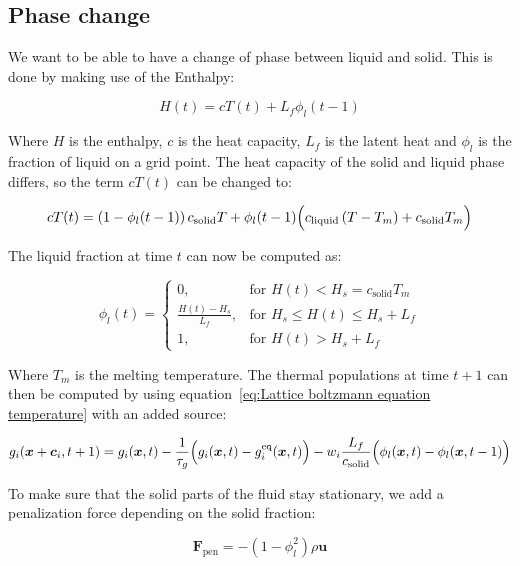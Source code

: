 \subsection{Phase change}
We want to be able to have a change of phase between liquid and solid. This is done by making use of the Enthalpy:

\begin{equation}\label{eq:Enthalpy}
    H(t) = c T(t) + L_f \phi_l(t-1)
\end{equation}

Where $H$ is the enthalpy, $c$ is the heat capacity, $L_f$ is the latent heat and $\phi_l$ is the fraction of liquid on a grid point. The heat capacity of the solid and liquid phase differs, so the term $c T(t)$ can be changed to:

\begin{equation}
    c T(t) = \left(1 - \phi_l(t-1)\right)c_{\text{solid}} T + \phi_l(t-1) \Bigl(c_{\text{liquid}} \left(T - T_m\right) + c_{\text{solid}}T_m\Bigr)
\end{equation}

The liquid fraction at time $t$ can now be computed as:

\begin{equation}
    \phi_l(t) = 
    \begin{cases}
        0, & \text{for } H(t) < H_s = c_{\text{solid}} T_m\\
        \frac{H(t)-H_s}{L_f}, & \text{for } H_s \leq H(t) \leq H_s + L_f\\
        1, & \text{for } H(t) > H_s + L_f
    \end{cases}
\end{equation}

Where $T_m$ is the melting temperature. The thermal populations at time $t+1$ can then be computed by using equation~\ref{eq:Lattice boltzmann equation temperature} with an added source:

\begin{equation}\label{eq:Lattice boltzmann equation temperature with phase change}
    g_i(\bm{x} + \bm{c}_i, t+1) = g_i(\bm{x}, t) - \frac{1}{\tau_g}\Bigl(g_i(\bm{x}, t) - g_i^{\text{eq}}(\bm{x}, t)\Bigr) - w_i \frac{L_f}{c_{\text{solid}}} \Bigl(\phi_l(\bm{x}, t)-\phi_l(\bm{x}, t-1)\Bigr)
\end{equation}

To make sure that the solid parts of the fluid stay stationary, we add a penalization force depending on the solid fraction:

\begin{equation}
    \bm{F}_{\text{pen}} = -\left(1 - \phi_l^2\right)\rho\bm{u}
\end{equation}

